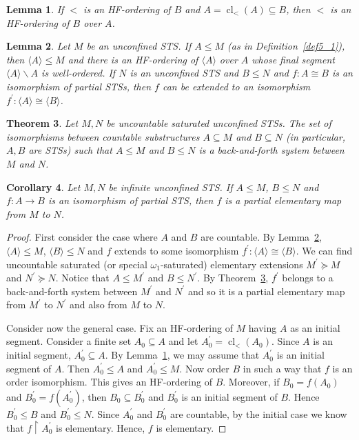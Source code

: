 \documentclass[10pt,a4paper]{article}
\DeclareMathOperator{\cl}{cl}
\theoremstyle{note}
\newtheorem{thm}{Theorem}[section]
\newtheorem{lemma}[thm]{Lemma}
\newtheorem{cor}[thm]{Corollary}
\begin{document}
\begin{lemma}\label{Feb_23_2024_7} If $<$ is an HF-ordering of $B$  and $A=\cl_<(A)\subseteq B$, then  $<$ is an HF-ordering of $B$ over $A$. 
\end{lemma}

\begin{lemma} \label{May_26_2024_2} Let $M$ be an unconfined STS.  If $A\leq M$ (as in Definition~\ref{def5_1}), then  $\langle A\rangle \leq M$ and there is an HF-ordering of $\langle A\rangle$ over $A$ whose final segment $\langle A\rangle \smallsetminus A$ is well-ordered. If $N$ is an unconfined STS and $B\leq N$ and $f:A\cong B$ is an isomorphism of partial STSs, then $f$ can be extended to an isomorphism $f^\prime :\langle A\rangle \cong \langle B \rangle$.
\end{lemma}

\begin{thm} \label{May_26_2024_4} Let $M,N$ be uncountable saturated unconfined STSs. The set of isomorphisms between countable substructures $A\subseteq M$ and $B\subseteq N$  (in particular,  $A,B$ are STSs)  such that $A\leq M$ and $B\leq N$ is a back-and-forth system between $M$ and $N$.
\end{thm}	

\begin{cor}\label{elementary} Let $M,N$ be infinite unconfined STS. If $A\leq M$, $B\leq N$ and $f:A\rightarrow B$ is an isomorphism of partial STS, then $f$ is a partial elementary map from $M$ to $N$.
	\end{cor}

	\begin{proof} First consider the case where $A$ and $B$ are countable.  By Lemma~\ref{May_26_2024_2}, $\langle A\rangle \leq M$,  $\langle B\rangle \leq N$  and $f$ extends to some isomorphism  $f^\prime:\langle A\rangle \cong \langle B\rangle $.
		 We can find uncountable saturated (or special $\omega_1$-saturated) elementary extensions  $M^\prime\succeq M$ and $N^\prime\succeq N$. Notice that  $A\leq M^\prime$  and $B\leq N^\prime$.  By  Theorem~\ref{May_26_2024_4}, $f^\prime$ belongs to a back-and-forth system between $M^\prime$ and $N^\prime$ and so it is a partial elementary map from $M^\prime$ to $N^\prime$ and also from $M$ to $N$.
		
		Consider now the general case.  Fix an HF-ordering of $M$ having $A$ as an initial segment.  Consider a finite set $A_0\subseteq A$ and let $A_0^\prime =\cl_<(A_0)$.  Since $A$ is an initial segment, $A_0^\prime\subseteq A$. By Lemma~\ref{Feb_23_2024_7},  we may assume that $A_0^\prime$ is an initial segment of  $A$. Then $A_0^\prime\leq A$  and  $A_0^\prime\leq M$. Now order $B$ in such a way that $f$ is an order isomorphism. This gives an HF-ordering of $B$.  Moreover, if $B_0=f(A_0)$ and $B_0^\prime= f(A_0^\prime)$, then  $B_0\subseteq B_0^\prime$ and $B_0^\prime$ is an initial segment of $B$. Hence  $B_0^\prime\leq B$  and  $B_0^\prime\leq N$. Since $A_0^\prime$ and $B_0^\prime$ are countable, by the initial case we know that $f\restriction A_0^\prime$ is elementary. Hence, $f$ is elementary.
	\end{proof}
\end{document}
